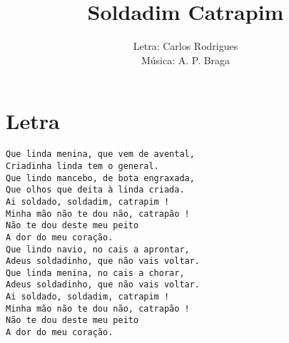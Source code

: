 \documentclass[12pt,a4paper]{article}
\begin{document}
\title{Soldadim Catrapim}
\author{Letra: Carlos Rodrigues\\Música: A. P. Braga\\}
\date{}
\maketitle
\section*{Letra}
\begin{verbatim}Que linda menina, que vem de avental,
Criadinha linda tem o general.
Que lindo mancebo, de bota engraxada,
Que olhos que deita à linda criada.
Ai soldado, soldadim, catrapim !
Minha mão não te dou não, catrapão !
Não te dou deste meu peito
A dor do meu coração.
Que lindo navio, no cais a aprontar,
Adeus soldadinho, que não vais voltar.
Que linda menina, no cais a chorar,
Adeus soldadinho, que não vais voltar.
Ai soldado, soldadim, catrapim !
Minha mão não te dou não, catrapão !
Não te dou deste meu peito
A dor do meu coração.
\end{verbatim}
\end{document}
